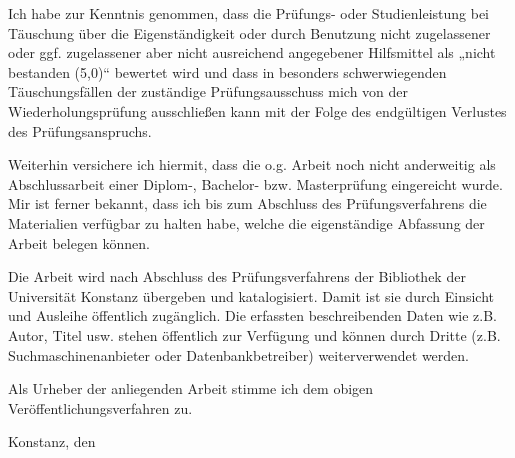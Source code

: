 \documentclass[
	oneside,
	parskip=half,
	a4paper,
]{scrbook}
\begin{document}
Ich habe zur Kenntnis genommen, dass die Prüfungs- oder Studienleistung bei Täuschung über die
Eigenständigkeit oder durch Benutzung nicht zugelassener oder ggf. zugelassener aber nicht
ausreichend angegebener Hilfsmittel als „nicht bestanden (5,0)“ bewertet wird und dass in besonders
schwerwiegenden Täuschungsfällen der zuständige Prüfungsausschuss mich von der
Wiederholungsprüfung ausschließen kann mit der Folge des endgültigen Verlustes des
Prüfungsanspruchs.

Weiterhin versichere ich hiermit, dass die o.g. Arbeit noch nicht anderweitig als Abschlussarbeit einer
Diplom-, Bachelor- bzw. Masterprüfung eingereicht wurde. Mir ist ferner bekannt, dass ich bis zum
Abschluss des Prüfungsverfahrens die Materialien verfügbar zu halten habe, welche die
eigenständige Abfassung der Arbeit belegen können.

Die Arbeit wird nach Abschluss des Prüfungsverfahrens der Bibliothek der Universität Konstanz
übergeben und katalogisiert. Damit ist sie durch Einsicht und Ausleihe öffentlich zugänglich. Die
erfassten beschreibenden Daten wie z.B. Autor, Titel usw. stehen öffentlich zur Verfügung und können
durch Dritte (z.B. Suchmaschinenanbieter oder Datenbankbetreiber) weiterverwendet werden.

Als Urheber der anliegenden Arbeit stimme ich dem obigen Veröffentlichungsverfahren zu.

Konstanz, den 
\end{document}
